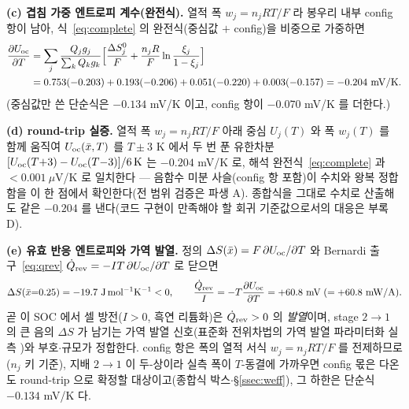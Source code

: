 \textbf{(c) 겹침 가중 엔트로피 계수(완전식).} 열적 폭 $w_j{=}n_jRT/F$ 라 봉우리 내부 config 항이 남아,
식~\eqref{eq:complete} 의 완전식(중심값 $+$ config)을 비중으로 가중하면
\begin{equation*}
\begin{aligned}
\frac{\partial U_{\mathrm{oc}}}{\partial T}
&=\sum_j\frac{Q_jg_j}{\sum_kQ_kg_k}\Big[\frac{\Delta S^0_j}{F}+\frac{n_jR}{F}\ln\frac{\xi_j}{1-\xi_j}\Big]\\
&=0.753(-0.203)+0.193(-0.206)+0.051(-0.220)+0.003(-0.157)
=-0.204\ \mathrm{mV/K}.
\end{aligned}
\end{equation*}
(중심값만 쓴 단순식은 $-0.134$ mV/K 이고, config 항이 $-0.070$ mV/K 를 더한다.)

\textbf{(d) round-trip 실증.} 열적 폭 $w_j{=}n_jRT/F$ 아래 중심 $U_j(T)$ 와 폭 $w_j(T)$ 를 함께 움직여
$U_{\mathrm{oc}}(\bar x,T)$ 를 $T\pm3$ K 에서 두 번 푼 유한차분 $[U_{\mathrm{oc}}(T{+}3)-U_{\mathrm{oc}}(T{-}3)]/6\,\mathrm K$ 는 $-0.204$
mV/K 로, 해석 완전식~\eqref{eq:complete} 과 $<\!0.001\ \mu$V/K 로 일치한다 --- 음함수 미분 사슬(config 항
포함)이 수치와 왕복 정합함을 이 한 점에서 확인한다(전 범위 검증은 파생 A). 종합식을 그대로 수치로 산출해도
같은 $-0.204$ 를 낸다(코드 구현이 만족해야 할 회귀 기준값으로서의 대응은 부록 D).

\textbf{(e) 유효 반응 엔트로피와 가역 발열.} 정의 $\Delta S(\bar x)=F\,\partial U_{\mathrm{oc}}/\partial T$ 와 Bernardi
출구~\eqref{eq:qrev} $\dot Q_{\mathrm{rev}}=-IT\,\partial U_{\mathrm{oc}}/\partial T$ 로 닫으면
\begin{equation*}
\Delta S(\bar x{=}0.25)=-19.7\ \mathrm{J\,mol^{-1}K^{-1}}<0,
\qquad
\frac{\dot Q_\rev}{I}=-T\frac{\partial U_\oc}{\partial T}=+60.8\ \mathrm{mV}\;(=+60.8\ \mathrm{mW/A}).
\end{equation*}
곧 이 SOC 에서 셀 방전($I>0$, 흑연 리튬화)은 $\dot Q_{\mathrm{rev}}>0$ 의 \emph{발열}이며, stage $2\!\to\!1$ 의 큰 음의
$\Delta S$ 가 남기는 가역 발열 신호(표준화 전위차법의 가역 발열 파라미터화 실측 \cite{standardised2024})와 부호$\cdot$규모가 정합한다.
config 항은 폭의 열적 서식 $w_j{=}n_jRT/F$ 를 전제하므로($n_j$ 키 기준), 지배 $2\!\to\!1$ 이 두-상이라 실측
폭이 $T$-동결에 가까우면 config 몫은 다온도 round-trip 으로 확정할 대상이고(종합식 박스$\cdot$\S\ref{ssec:weff}),
그 하한은 단순식 $-0.134$ mV/K 다.

